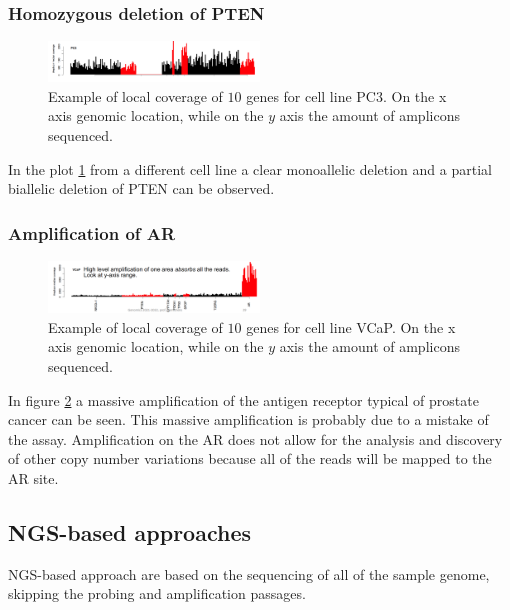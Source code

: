         \subsubsection{Homozygous deletion of PTEN}

        \begin{figure}[H]
            \centering
            \includegraphics[width=0.5\textwidth]{local_coverage1.png}
            \caption{Example of local coverage of $10$ genes for cell line PC3. On the x axis genomic location, while on the $y$ axis the amount of amplicons sequenced.}
            \label{fig:local1}
        \end{figure}

        In the plot \ref{fig:local1} from a different cell line a clear monoallelic deletion and a partial biallelic deletion of PTEN can be observed.

        \subsubsection{Amplification of AR}
        \begin{figure}[H]
            \centering
            \includegraphics[width=0.5\textwidth]{local_coverage2.png}
            \caption{Example of local coverage of $10$ genes for cell line VCaP. On the x axis genomic location, while on the $y$ axis the amount of amplicons sequenced.}
            \label{fig:local2}
        \end{figure}

        In figure \ref{fig:local2} a massive amplification of the antigen receptor typical of prostate cancer can be seen.
        This massive amplification is probably due to a mistake of the assay.
        Amplification on the AR does not allow for the analysis and discovery of other copy number variations because all of the reads will be mapped to the AR site.

    \subsection{NGS-based approaches}
    NGS-based approach are based on the sequencing of all of the sample genome, skipping the probing and amplification passages.

